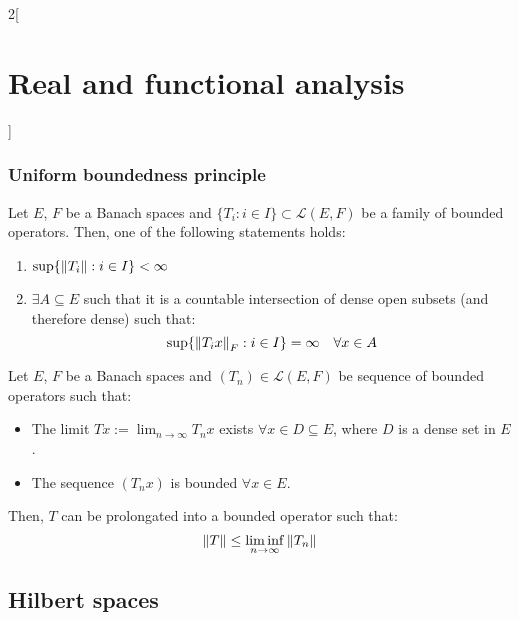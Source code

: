 \documentclass[../../../main_math.tex]{subfiles}
\begin{document}
\begin{multicols}{2}[\section{Real and functional analysis}]
  \subsubsection{Uniform boundedness principle}
  \begin{theorem}
    Let $E$, $F$ be a Banach spaces and $\{T_i:i\in I\}\subset\mathcal{L}(E, F)$ be a family of bounded operators. Then, one of the following statements holds:
    \begin{enumerate}
      \item $\sup\{\left\|T_i\right\|:i\in I\}<\infty$
      \item $\exists A\subseteq E$ such that it is a countable intersection of dense open subsets (and therefore dense) such that: $$\sup\{\left\|T_ix\right\|_F:i\in I\}=\infty\quad\forall x\in A$$
    \end{enumerate}
  \end{theorem}
  \begin{corollary}
    Let $E$, $F$ be a Banach spaces and $(T_n)\in\mathcal{L}(E,F)$ be sequence of bounded operators such that:
    \begin{itemize}
      \item The limit $Tx:=\displaystyle\lim_{n\to\infty}T_nx$ exists $\forall x\in D\subseteq E$, where $D$ is a dense set in $E$.
      \item The sequence $(T_nx)$ is bounded $\forall x\in E$.
    \end{itemize}
    Then, $T$ can be prolongated into a bounded operator such that: $$\left\|T\right\|\leq \liminf_{n\to\infty}\left\|T_n\right\|$$
  \end{corollary}
  \subsection{Hilbert spaces}

\end{multicols}
\end{document}
